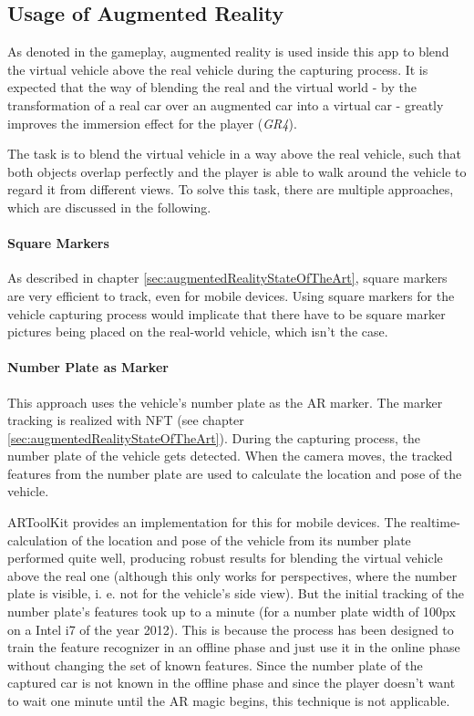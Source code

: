 \subsection{Usage of Augmented Reality}\label{sec:usageOfAR}
As denoted in the gameplay, augmented reality is used inside this app to blend the virtual vehicle above the real vehicle during the capturing process. It is expected that the way of blending the real and the virtual world - by the transformation of a real car over an augmented car into a virtual car - greatly improves the immersion effect for the player (\emph{GR4}).

The task is to blend the virtual vehicle in a way above the real vehicle, such that both objects overlap perfectly and the player is able to walk around the vehicle to regard it from different views. To solve this task, there are multiple approaches, which are discussed in the following.

\paragraph{Square Markers}
As described in chapter \ref{sec:augmentedRealityStateOfTheArt}, square markers are very efficient to track, even for mobile devices. Using square markers for the vehicle capturing process would implicate that there have to be square marker pictures being placed on the real-world vehicle, which isn't the case.

\paragraph{Number Plate as Marker}
This approach uses the vehicle's number plate as the AR marker. The marker tracking is realized with NFT (see chapter \ref{sec:augmentedRealityStateOfTheArt}). During the capturing process, the number plate of the vehicle gets detected. When the camera moves, the tracked features from the number plate are used to calculate the location and pose of the vehicle.

ARToolKit provides an implementation for this for mobile devices. The realtime-calculation of the location and pose of the vehicle from its number plate performed quite well, producing robust results for blending the virtual vehicle above the real one (although this only works for perspectives, where the number plate is visible, i. e. not for the vehicle's side view). But the initial tracking of the number plate's features took up to a minute (for a number plate width of 100px on a Intel i7 of the year 2012). This is because the process has been designed to train the feature recognizer in an offline phase and just use it in the online phase without changing the set of known features. Since the number plate of the captured car is not known in the offline phase and since the player doesn’t want to wait one minute until the AR magic begins, this technique is not applicable.


